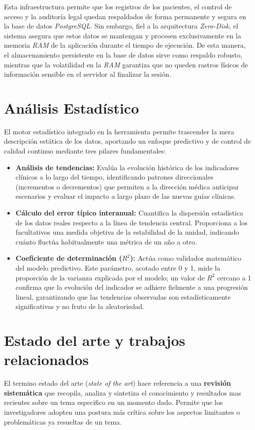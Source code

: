 Esta infraestructura permite que los registros de los pacientes, el control de acceso y la auditoría legal quedan respaldados de forma permanente y segura en la base de datos \textit{PostgreSQL}. Sin embargo, fiel a la arquitectura \textit{Zero-Disk}, el sistema asegura que estos datos se mantengan y procesen exclusivamente en la memoria \textit{RAM} de la aplicación durante el tiempo de ejecución. De esta manera, el almacenamiento persistente en la base de datos sirve como respaldo robusto, mientras que la volatilidad en la \textit{RAM} garantiza que no queden rastros físicos de información sensible en el servidor al finalizar la sesión.


\section{Análisis Estadístico}
El motor estadístico integrado en la herramienta permite trascender la mera descripción estática de los datos, aportando un enfoque predictivo y de control de calidad continuo mediante tres pilares fundamentales:

\begin{itemize}
    \item \textbf{Análisis de tendencias:} Evalúa la evolución histórica de los indicadores clínicos a lo largo del tiempo, identificando patrones direccionales (incrementos o decrementos) que permiten a la dirección médica anticipar escenarios y evaluar el impacto a largo plazo de las nuevas guías clínicas. \cite{tendencia}
    \item \textbf{Cálculo del error típico interanual:} Cuantifica la dispersión estadística de los datos reales respecto a la línea de tendencia central. Proporciona a los facultativos una medida objetiva de la estabilidad de la unidad, indicando cuánto fluctúa habitualmente una métrica de un año a otro. \cite{errro_tipico}
    \item \textbf{Coeficiente de determinación ($R^2$):} Actúa como validador matemático del modelo predictivo. Este parámetro, acotado entre 0 y 1, mide la proporción de la varianza explicada por el modelo; un valor de $R^2$ cercano a 1 confirma que la evolución del indicador se adhiere fielmente a una progresión lineal, garantizando que las tendencias observadas son estadísticamente significativas y no fruto de la aleatoriedad. \cite{r2}
\end{itemize}

\section{Estado del arte y trabajos relacionados}
El termino estado del arte (\textit{state of the art}) hace referencia a una \textbf{revisión sistemática} que recopila, analiza y sintetiza el conocimiento y resultados mas recientes sobre un tema especifico en un momento dado.
Permite que los investigadores adopten una postura más crítica sobre los aspectos limitantes o problemáticas ya resueltas de un tema.

